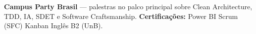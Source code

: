 
\medskip
{}
\textbf{Campus Party Brasil} — palestras no palco principal sobre Clean Architecture, TDD, IA, SDET e Software Craftsmanship.
\divider
\textbf{Certificações:} Power BI \textbullet{} Scrum (SFC) \textbullet{} Kanban \textbullet{} Inglês B2 (UnB).
